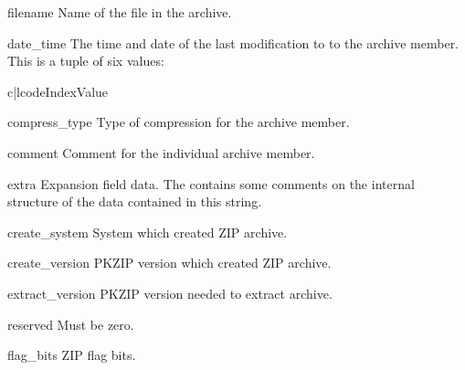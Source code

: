 \begin{memberdesc}[ZipInfo]{filename}
  Name of the file in the archive.
\end{memberdesc}

\begin{memberdesc}[ZipInfo]{date_time}
  The time and date of the last modification to to the archive
  member.  This is a tuple of six values:

\begin{tableii}{c|l}{code}{Index}{Value}
\end{tableii}
\end{memberdesc}

\begin{memberdesc}[ZipInfo]{compress_type}
  Type of compression for the archive member.
\end{memberdesc}

\begin{memberdesc}[ZipInfo]{comment}
  Comment for the individual archive member.
\end{memberdesc}

\begin{memberdesc}[ZipInfo]{extra}
  Expansion field data.  The
   contains some comments on the internal structure of the data
  contained in this string.
\end{memberdesc}

\begin{memberdesc}[ZipInfo]{create_system}
  System which created ZIP archive.
\end{memberdesc}

\begin{memberdesc}[ZipInfo]{create_version}
  PKZIP version which created ZIP archive.
\end{memberdesc}

\begin{memberdesc}[ZipInfo]{extract_version}
  PKZIP version needed to extract archive.
\end{memberdesc}

\begin{memberdesc}[ZipInfo]{reserved}
  Must be zero.
\end{memberdesc}

\begin{memberdesc}[ZipInfo]{flag_bits}
  ZIP flag bits.
\end{memberdesc}

